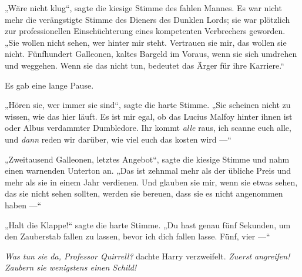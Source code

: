 „Wäre nicht klug“, sagte die kiesige Stimme des fahlen Mannes. Es war nicht mehr die verängstigte Stimme des Dieners des Dunklen Lords; sie war plötzlich zur professionellen Einschüchterung eines kompetenten Verbrechers geworden.
„Sie wollen nicht sehen, wer hinter mir steht. Vertrauen sie mir, das wollen sie nicht. Fünfhundert Galleonen, kaltes Bargeld im Voraus, wenn sie sich umdrehen und weggehen. Wenn sie das nicht tun, bedeutet das Ärger für ihre Karriere.“

Es gab eine lange Pause.

„Hören sie, wer immer sie sind“, sagte die harte Stimme.
„Sie scheinen nicht zu wissen, wie das hier läuft. Es ist mir egal, ob das Lucius Malfoy hinter ihnen ist oder Albus verdammter Dumbledore. Ihr kommt \emph{alle} raus, ich scanne euch alle, und \emph{dann} reden wir darüber, wie viel euch das kosten wird —“

„Zweitausend Galleonen, letztes Angebot“, sagte die kiesige Stimme und nahm einen warnenden Unterton an.
„Das ist zehnmal mehr als der übliche Preis und mehr als sie in einem Jahr verdienen. Und glauben sie mir, wenn sie etwas sehen, das sie nicht sehen sollten, werden sie bereuen, dass sie es nicht angenommen haben —“

„Halt die Klappe!“ sagte die harte Stimme.
„Du hast genau fünf Sekunden, um den Zauberstab fallen zu lassen, bevor ich dich fallen lasse. Fünf, vier —“

\emph{Was tun sie da, Professor Quirrell?} dachte Harry verzweifelt. \emph{Zuerst angreifen! Zaubern sie wenigstens einen Schild!}

